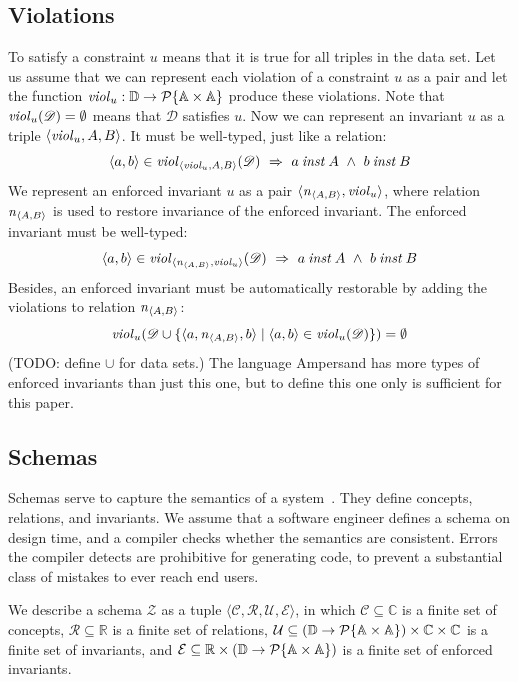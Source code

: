 \documentclass[runningheads]{llncs}
\newcommand{\id}[1]{\text{\it #1\/}}
\newcommand{\instance}{\mathbin{\id{inst}}}
\newcommand{\viol}[2]{\violC{#1}(#2)}
\newcommand{\violC}[1]{\id{viol}_{#1}}
\newcommand{\powerset}[1]{\cal{P}\{#1\}}
\newcommand{\declare}[3]{\id{#1}_{\pair{#2}{#3}}}
\newcommand{\pair}[2]{\langle{#1},{#2}\rangle}
\newcommand{\Pair}[2]{#1\times#2}
\newcommand{\triple}[3]{\langle{#1},{#2},{#3}\rangle}
\newcommand{\quadruple}[4]{\langle{#1},{#2},{#3},{#4}\rangle}
\newcommand{\Atoms}{\mathbb{A}}
\newcommand{\concepts}{\mathcal{C}}
\newcommand{\Concepts}{\mathbb{C}}
\newcommand{\rels}{\mathcal{R}}   %
\newcommand{\Rels}{\mathbb{R}}   %
\newcommand{\Triple}[3]{#1\times#2\times#3}
\newcommand{\enforces}{\mathcal{E}}
\newcommand{\rules}{\mathcal{U}}
\newcommand{\dataset}{\mathscr{D}}
\newcommand{\Dataset}{\mathbb{D}}
\newcommand{\schema}{\mathscr{Z}}
\begin{document}
\subsection{Violations}
\label{sct:Violations}
   To satisfy a constraint $u$ means that it is true for all triples in the data set.
   Let us assume that we can represent each violation of a constraint $u$ as a pair
   and let the function $\violC{u}:\Dataset\rightarrow\powerset{\Pair{\Atoms}{\Atoms}}$ produce these violations.
   Note that $\viol{u}{\dataset}=\emptyset$ means that $\dataset$ satisfies $u$.
   Now we can represent an invariant $u$ as a triple $\triple{\violC{u}}{A}{B}$.
   It must be well-typed, just like a relation:
\begin{equation}
   \pair{a}{b}\in\viol{\triple{\violC{u}}{A}{B}}{\dataset}\ \Rightarrow\ a\instance A\ \wedge\ b\instance B
\end{equation}
   We represent an enforced invariant $u$ as a pair $\pair{\declare{n}{A}{B}}{\violC{u}}$,
   where relation $\declare{n}{A}{B}$ is used to restore invariance of the enforced invariant.
   The enforced invariant must be well-typed:
\begin{equation}
   \pair{a}{b}\in\viol{\pair{\declare{n}{A}{B}}{\violC{u}}}{\dataset}\ \Rightarrow\ a\instance A\ \wedge\ b\instance B
\end{equation}
   Besides, an enforced invariant must be automatically restorable by adding the violations to relation $\declare{n}{A}{B}$:
\begin{equation}
   \viol{u}{\dataset\cup\{\triple{a}{\declare{n}{A}{B}}{b}\mid\pair{a}{b}\in\viol{u}{\dataset}\}}=\emptyset
\end{equation}
   (TODO: define $\cup$ for data sets.)
   The language Ampersand has more types of enforced invariants than just this one,
   but to define this one only is sufficient for this paper.

\subsection{Schemas}
\label{sct:Schemas}
   Schemas serve to capture the semantics of a system~\cite{Spivak2012}.
   They define concepts, relations, and invariants.
   We assume that a software engineer defines a schema on design time, and a compiler checks whether the semantics are consistent.
   Errors the compiler detects are prohibitive for generating code,
   to prevent a substantial class of mistakes to ever reach end users.

   We describe a schema $\schema$ as a tuple $\quadruple{\concepts}{\rels}{\rules}{\enforces}$,
   in which $\concepts\subseteq \Concepts$ is a finite set of concepts,
   $\rels\subseteq \Rels$ is a finite set of relations,
   $\rules\subseteq \Triple{(\Dataset \to \powerset{\Pair{\Atoms}{\Atoms}})}{\Concepts}{\Concepts}$ is a finite set of invariants,
   and $\enforces\subseteq \Pair{\Rels}{\left(\Dataset \to \powerset{\Pair{\Atoms}{\Atoms}}\right)}$ is a finite set of enforced invariants.
   
\end{document}
